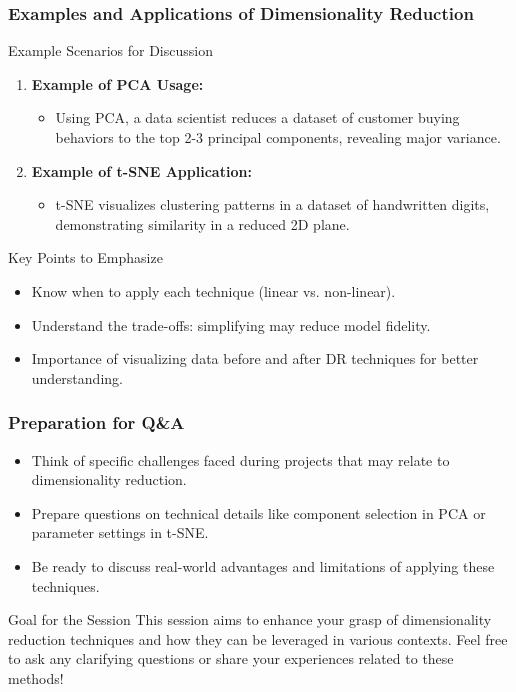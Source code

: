 \documentclass[aspectratio=169]{beamer}
\begin{document}
\begin{frame}[fragile]
    \frametitle{Examples and Applications of Dimensionality Reduction}
    
    \begin{block}{Example Scenarios for Discussion}
        \begin{enumerate}
            \item \textbf{Example of PCA Usage:}
            \begin{itemize}
                \item Using PCA, a data scientist reduces a dataset of customer buying behaviors to the top 2-3 principal components, revealing major variance.
            \end{itemize}
    
            \item \textbf{Example of t-SNE Application:}
            \begin{itemize}
                \item t-SNE visualizes clustering patterns in a dataset of handwritten digits, demonstrating similarity in a reduced 2D plane.
            \end{itemize}
        \end{enumerate}
    \end{block}
    
    \begin{block}{Key Points to Emphasize}
        \begin{itemize}
            \item Know when to apply each technique (linear vs. non-linear).
            \item Understand the trade-offs: simplifying may reduce model fidelity.
            \item Importance of visualizing data before and after DR techniques for better understanding.
        \end{itemize}
    \end{block}
\end{frame}

\begin{frame}[fragile]
    \frametitle{Preparation for Q\&A}
    
    \begin{itemize}
        \item Think of specific challenges faced during projects that may relate to dimensionality reduction.
        \item Prepare questions on technical details like component selection in PCA or parameter settings in t-SNE.
        \item Be ready to discuss real-world advantages and limitations of applying these techniques.
    \end{itemize}
    
    \begin{block}{Goal for the Session}
        This session aims to enhance your grasp of dimensionality reduction techniques and how they can be leveraged in various contexts. Feel free to ask any clarifying questions or share your experiences related to these methods!
    \end{block}
\end{frame}
\end{document}
